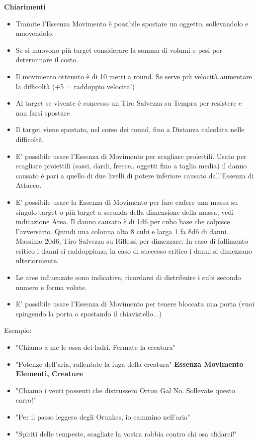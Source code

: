 \documentclass[a4paper,11pt,twoside,openany]{book}
\begin{document}
\textbf{Chiarimenti}
\begin{itemize}
	\item
	      Tramite l'Essenza Movimento è possibile spostare un oggetto, sollevandolo e muovendolo.
	\item
	      Se si muovono più target considerare la somma di volumi e pesi per determinare il costo.
	\item
	      Il movimento ottenuto è di 10 metri a round. Se serve più velocità aumentare la difficoltà (+5 = raddoppio velocita')
	\item
	      Al target se vivente è concesso un Tiro Salvezza su Tempra per resistere e non farsi spostare
	\item
	      Il target viene spostato, nel corso dei round, fino a Distanza calcolata nelle difficoltà.
	\item
	      E' possibile usare l'Essenza di Movimento per scagliare proiettili. Usato per scagliare proiettili (sassi, dardi, frecce.. oggetti fino a taglia media) il danno causato è pari a quello di due livelli di potere inferiore causato dall'Essenza di Attacco.
	\item
	      E' possibile usare la Essenza di Movimento per fare cadere una massa su singolo target o più target a seconda della dimensione della massa, vedi indicazione Area. Il danno causato è di 1d6 per cubo base che colpisce l'avversario. Quindi una colonna alta 8 cubi e larga 1 fa 8d6 di danni. Massimo 20d6, Tiro Salvezza su Riflessi per dimezzare. In caso di fallimento critico i danni si raddoppiano, in caso di successo critico i danni si dimezzano ulteriormente.
	\item
	      Le aree influenzate sono indicative, ricordarsi di distribuire i cubi secondo numero e forma volute.
	      
	\item E' possibile usare l'Essenza di Movimento per tenere bloccata una porta (vuoi spingendo la porta o spostando il chiavistello...)
	
\end{itemize}
\bigskip


Esempio:
\begin{itemize}
	\item 	"Chiamo a me le ossa dei ladri. Fermate la creatura"
	\item 	"Potenze dell'aria, rallentate la fuga della creatura"
	\textbf{Essenza Movimento -- Elementi, Creature}
	\item "Chiamo i venti possenti che distrussero Orton Gal No. Sollevate questo carro!"
	\item "Per il passo leggero degli Orunkes, io cammino nell'aria"
	\item "Spiriti delle tempeste, scagliate la vostra rabbia contro chi osa sfidarci!"
\end{itemize}
\end{document}
